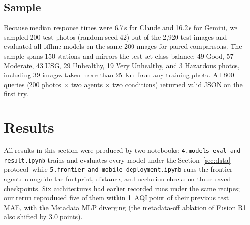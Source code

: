 \documentclass[conference]{IEEEtran}
\begin{document}
\subsection{Sample}

Because median response times were 6.7\,s for Claude and 16.2\,s for Gemini, we
sampled 200 test photos (random seed 42) out of the 2,920 test images and
evaluated all offline models on the same 200 images for paired comparisons. The
sample spans 150 stations and mirrors the test-set class balance: 49 Good, 57
Moderate, 43 USG, 29 Unhealthy, 19 Very Unhealthy, and 3 Hazardous photos,
including 39 images taken more than 25~km from any training photo. All 800
queries (200 photos $\times$ two agents $\times$ two conditions) returned valid
JSON on the first try.

\section{Results}
\label{sec:results}

All results in this section were produced by two notebooks:
\texttt{4.models-eval-and-result.ipynb} trains and evaluates every model under
the Section~\ref{sec:data} protocol, while
\texttt{5.frontier-and-mobile-deployment.ipynb} runs the frontier agents
alongside the footprint, distance, and occlusion checks on those saved
checkpoints. Six architectures had earlier recorded runs under the same recipes;
our rerun reproduced five of them within 1~AQI point of their previous test MAE,
with the Metadata MLP diverging (the metadata-off ablation of Fusion R1 also
shifted by 3.0 points).
\end{document}
